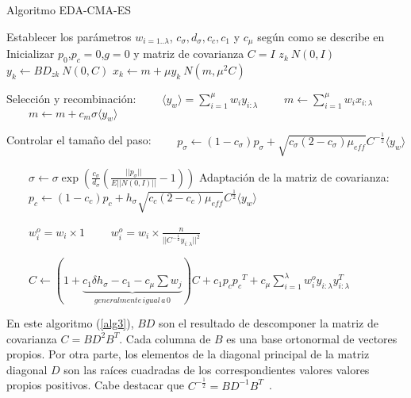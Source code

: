 \begin{algorithm}[H]
	\caption{Algoritmo EDA-CMA-ES}
	\label{alg3}
	\begin{algorithmic}[1]
		\STATE Establecer los parámetros $w_{i=1..\lambda}$, $c_{\sigma},d_{\sigma},c_{c},c_{1}$ y $c_{\mu}$ según como se describe en \cite{Hansen2016}
		\STATE Inicializar $p_{0}$,$p_{c}=0$,$g=0$ y matriz de covarianza $C=I$
		\STATE $z_{k} ~ N(0,I) $
		\STATE $y_{k} \leftarrow BD_{zk} ~ N(0,C) $
		\STATE $x_{k} \leftarrow m +\mu y_{k} ~N(m,\mu^{2}C) $
		\ENDFOR
		
		Selección y recombinación: 
		\STATE $\qquad \langle y_{w} \rangle=\sum_{i=1}^{\mu}w_{i}y_{i:\lambda}$
		\STATE $\qquad m\leftarrow \sum_{i=1}^{\mu}w_{i}x_{i:\lambda}$
		\ELSE
		\STATE $\qquad m\leftarrow m+c_{m}\sigma\langle y_{w} \rangle$
		\ENDIF
		
		Controlar el tamaño del paso:
		\STATE $\qquad p_{\sigma}\leftarrow (1-c_{\sigma})p_{\sigma}+\sqrt{c_{\sigma}(2-c_{\sigma})\mu_{eff}}C^{-\frac{1}{2}}\langle y_{w} \rangle$
		
		\STATE $\qquad \sigma \leftarrow \sigma \exp(\frac{c_{\sigma}}{d_{\sigma}}(\frac{||p_{\sigma}||}{E||N(0,I)||}-1))$
		Adaptación de la matriz de covarianza:
		\STATE $\qquad p_{c} \leftarrow (1-c_{c})p_{c}+h_{\sigma}\sqrt{c_{c}(2-c_{c})\mu_{eff}}C^{\frac{1}{2}}\langle y_{w} \rangle$
		
		\STATE {}
		\STATE $\qquad w^{o}_{i} = w_{i} \times 1 $
		\ELSE
		\STATE $\qquad w^{o}_{i} = w_{i} \times \frac{n}{||C^{-\frac{1}{2}}y_{i:\lambda}||^{2}} $
		\ENDIF
		
		$\qquad C\leftarrow (1+\underset{generalmente\,igual\,a\, 0}{\underbrace{c_{1}\delta h_{\sigma}-c_{1}-c_{\mu}\sum w_{j}}})C + c_{1}p_{c}{p_{c}}^T+ c_{\mu}\sum_{i=1}^{\lambda}w^{o}_{i}y_{i:\lambda}y_{i:\lambda}^T$
		
		\ENDWHILE
	\end{algorithmic}
\end{algorithm}	

En este algoritmo (\ref{alg3}), $BD$ son el resultado de descomponer la matriz de covarianza $C=BD^{2}B^T$. Cada columna de $B$ es una base ortonormal de vectores propios. Por otra parte, los elementos de la diagonal principal de la matriz diagonal $D$ son las raíces cuadradas de los correspondientes valores valores propios positivos. Cabe destacar que $C^{-\frac{1}{2}}= BD^{-1}B^T$~\cite{Hansen2016}.

